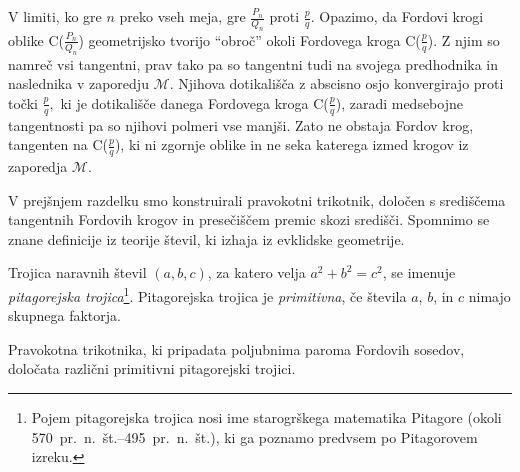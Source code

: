 \documentclass[mat1]{fmfdelo}
\begin{document}
\begin{dokaz}
\begin{figure}[h!]
\begin{center}
\end{center}
\end{figure}
%
V limiti, ko gre $n$ preko vseh meja, gre $\frac{P_n}{Q_n}$ proti $\frac{p}{q}.$
Opazimo, da Fordovi krogi oblike C($\frac{P_n}{Q_n}$) geometrijsko tvorijo ``obroč'' okoli Fordovega kroga C($\frac{p}{q}$). Z njim so namreč vsi tangentni, prav tako pa so tangentni tudi na svojega predhodnika in naslednika v zaporedju $\mathcal{M}$. Njihova dotikališča z abscisno osjo konvergirajo proti točki $\frac{p}{q},$ ki je dotikališče danega Fordovega kroga C($\frac{p}{q}$), zaradi medsebojne tangentnosti pa so njihovi polmeri vse manjši. Zato ne obstaja Fordov krog, tangenten na C($\frac{p}{q}$), ki ni zgornje oblike in ne seka katerega izmed krogov iz zaporedja $\mathcal{M}$.
%
\end{dokaz}

%
V prejšnjem razdelku smo konstruirali pravokotni trikotnik, določen s središčema tangentnih Fordovih krogov in presečiščem premic skozi središči. Spomnimo se znane definicije iz teorije števil, ki izhaja iz evklidske geometrije. 

\begin{definicija}
Trojica naravnih števil $(a,b,c)$, za katero velja $a^2+b^2=c^2$, se imenuje \emph{pitagorejska trojica}\footnote{Pojem pitagorejska trojica nosi ime starogrškega matematika Pitagore (okoli 570~pr.~n.~št.--495~pr.~n.~št.), ki ga poznamo predvsem po Pitagorovem izreku.}.
Pitagorejska trojica je \emph{primitivna}, če števila $a$, $b$, in $c$ nimajo skupnega faktorja.
\end{definicija}

\begin{trditev}
Pravokotna trikotnika, ki pripadata poljubnima paroma Fordovih sosedov, določata različni primitivni pitagorejski trojici.
\end{trditev}
\end{document}
